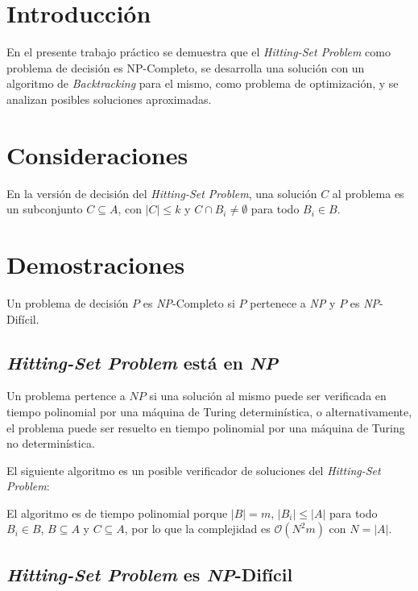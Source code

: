 \section{Introducción}

En el presente trabajo práctico se demuestra que el \textit{Hitting-Set
Problem} como problema de decisión es NP-Completo, se desarrolla una solución
con un algoritmo de \textit{Backtracking} para el mismo, como problema de
optimización, y se analizan posibles soluciones aproximadas.

\section{Consideraciones}

En la versión de decisión del \textit{Hitting-Set Problem}, una solución $C$ al
problema es un subconjunto $C \subseteq A$, con $|C| \le k$ y $C \cap B_i \ne
\emptyset$ para todo $B_i \in B$.

\section{Demostraciones}

Un problema de decisión $P$ es \textit{NP}-Completo si $P$ pertenece a
\textit{NP} y $P$ es \textit{NP}-Difícil.

\subsection{\textit{Hitting-Set Problem} está en \textit{NP}}

Un problema pertence a $NP$ si una solución al mismo puede ser verificada en
tiempo polinomial por una máquina de Turing determinística, o alternativamente,
el problema puede ser resuelto en tiempo polinomial por una máquina de Turing
no determinística.

El siguiente algoritmo es un posible verificador de soluciones del
\textit{Hitting-Set Problem}:



El algoritmo es de tiempo polinomial porque $|B| = m$, $|B_i| \le |A|$ para
todo $B_i \in B$, $B \subseteq A$ y $C \subseteq A$, por lo que la complejidad
es $\mathcal{O}(N^2m)$ con $N = |A|$.

\subsection{\textit{Hitting-Set Problem} es \textit{NP}-Difícil}

